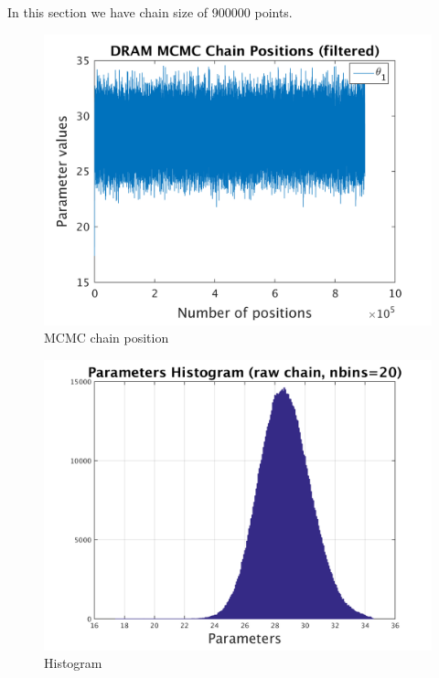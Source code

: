 In this section we have chain size of 900000 points. 

\begin{figure}[H]
  
  \centering
   \includegraphics[scale=0.75]{53_results/output_900000/simple_ip_chain_pos_filt}
   \caption{MCMC chain position }
\end{figure}


\begin{figure}[H]
  
  \centering
   \includegraphics[scale=0.75]{53_results/output_900000/simple_ip_hist_raw}
   \caption{Histogram}
\end{figure}



